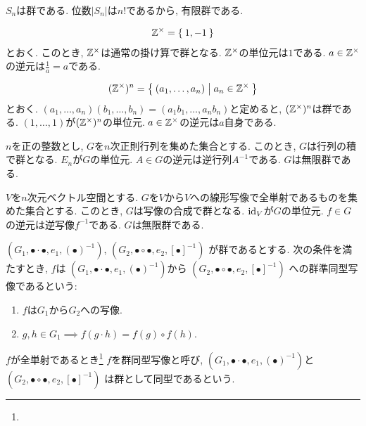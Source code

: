\begin{example}
  $S_n$は群である.
  位数$|S_n|$は$n!$であるから,
  有限群である.
\end{example}
\begin{example}
\begin{align*}
  \mathbb{Z}^{\times}=\Set{1,-1}
\end{align*}
とおく. このとき, $\mathbb{Z}^{\times}$は通常の掛け算で群となる.
$\mathbb{Z}^{\times}$の単位元は$1$である.
$a\in \mathbb{Z}^{\times}$の逆元は$\frac{1}{a}=a$である.
\end{example}
\begin{example}
\begin{align*}
  (\mathbb{Z}^{\times})^{n}=\Set{(a_1,\ldots, a_n)|a_n\in \mathbb{Z}^{\times}}
\end{align*}
とおく. $(a_1,\ldots, a_n)(b_1,\ldots, b_n)=(a_1b_1,\ldots, a_nb_n)$と定めると,
$(\mathbb{Z}^{\times})^{n}$は群である.
$(1,\ldots, 1)$が$(\mathbb{Z}^{\times})^{n}$の単位元.
$a\in \mathbb{Z}^{\times}$の逆元は$a$自身である.
\end{example}
\begin{example}
  $n$を正の整数とし,
  $G$を$n$次正則行列を集めた集合とする.
  このとき, $G$は行列の積で群となる.
  $E_n$が$G$の単位元.
  $A\in G$の逆元は逆行列$A^{-1}$である.
  $G$は無限群である.
\end{example}
\begin{example}
  $V$を$n$次元ベクトル空間とする.
  $G$を$V$から$V$への線形写像で全単射であるものを集めた集合とする.
  このとき, $G$は写像の合成で群となる.
  $\operatorname{id}_V$が$G$の単位元.
  $f\in G$の逆元は逆写像$f^{-1}$である.
  $G$は無限群である.
\end{example}

\begin{definition}
  $(G_1,\bullet\cdot\bullet,e_1,(\bullet)^{-1})$,
  $(G_2,\bullet\circ\bullet,e_2,[\bullet]^{-1})$
  が群であるとする.
  次の条件を満たすとき,
  $f$は
  $(G_1,\bullet\cdot\bullet,e_1,(\bullet)^{-1})$から
  $(G_2,\bullet\circ\bullet,e_2,[\bullet]^{-1})$
  への群準同型写像であるという:
  \begin{enumerate}
  \item $f$は$G_1$から$G_2$への写像.
  \item $g,h\in G_1\implies f(g\cdot h)=f(g)\circ f(h)$.
  \end{enumerate}
  $f$が全単射であるとき\footnote{}
  $f$を群同型写像と呼び,
  $(G_1,\bullet\cdot\bullet,e_1,(\bullet)^{-1})$と
  $(G_2,\bullet\circ\bullet,e_2,[\bullet]^{-1})$
  は群として同型であるという.
\end{definition}


